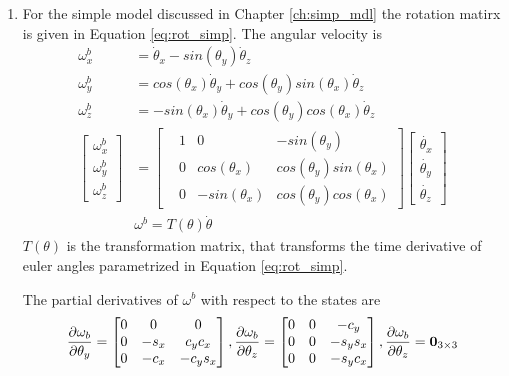 \begin{enumerate}
\item For the simple model discussed in Chapter \ref{ch:simp_mdl} the rotation matirx is given in Equation \ref{eq:rot_simp}. The angular velocity is
\begin{equation}
	\begin{split}
	\omega_x^b &= \dot{\theta}_x - sin(\theta_y)\dot{\theta}_z \\
	\omega_y^b &= cos(\theta_x)\dot{\theta}_y + cos(\theta_y)sin(\theta_x)\dot{\theta}_z \\
	\omega_z^b &= -sin(\theta_x)\dot{\theta}_y + cos(\theta_y)cos(\theta_x)\dot{\theta}_z \\
	\begin{bmatrix}
	\omega_x^b\\ \omega_y^b\\ \omega_z^b
	\end{bmatrix}
	 &= 
	\begin{bmatrix}
	 &1 &0 &-sin(\theta_y)\\
	 &0  &cos(\theta_x) &cos(\theta_y)sin(\theta_x)\\
	 &0  &-sin(\theta_x) &cos(\theta_y)cos(\theta_x)
	\end{bmatrix}
	\begin{bmatrix}
			\dot{\theta_x} \\ \dot{\theta_y}\\ \dot{\theta_z}
	\end{bmatrix}\\
	&\omega^b = T(\theta) \dot{\theta}
	\end{split}
\end{equation}
$T(\theta)$ is the transformation matrix, that transforms the time derivative of euler angles parametrized in Equation \ref{eq:rot_simp}.

The partial derivatives of $\omega^b$ with respect to the states are
$$\frac{\partial {\omega_b}}{\partial {\theta_y}} = \begin{bmatrix}0 &0 &0\\ 0 &-s_x &c_yc_x\\ 0 &-c_x &-c_ys_x \end{bmatrix}, \frac{\partial {\omega_b}}{\partial {\theta_z}} = \begin{bmatrix}0 &0 &-c_y\\ 0 &0 &-s_ys_x\\ 0 &0 &-s_yc_x \end{bmatrix},\frac{\partial {\omega_b}}{\partial {\theta_z}} = \textbf{0}_{3\times 3} $$
\end{enumerate}
